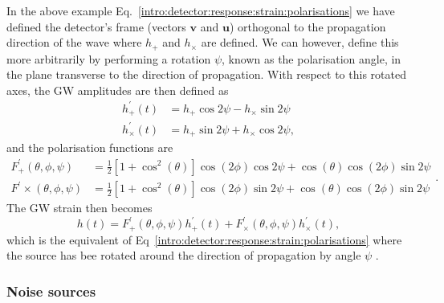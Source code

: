 In the above example Eq.~\ref{intro:detector:response:strain:polarisations} we
have defined the detector's frame (vectors $\bm{v}$ and $\bm{u}$) orthogonal to the propagation direction of the wave where $h_{+}$ and $h_{\times}$ are defined. 
We can however, define this more arbitrarily by performing a rotation $\psi$, known as the polarisation angle, in the plane transverse to the direction of propagation. 
With respect to this rotated axes, the \gls{GW} amplitudes are then defined as
\begin{equation}
	\begin{split}
		h^{\prime}_{+}(t) &= h_{+}\cos{2\psi} - h_{\times}\sin{2\psi} \\
		h^{\prime}_{\times}(t) &= h_{+}\sin{2\psi} + h_{\times}\cos{2\psi},
	\end{split}
\end{equation}
and the polarisation functions are
\begin{equation}
\label{intro:detector:polarisationfuncs}
\begin{split}
F^{\prime}_{+}(\theta,\phi,\psi) &= \frac{1}{2} \left[ 1 + \cos^2 \left(\theta\right) \right] \cos\left(2\phi\right) \cos{2\psi} + \cos \left(\theta\right) \cos \left(2\phi \right) \sin{2\psi} \\
F^{\prime}{\times}(\theta,\phi,\psi) &= \frac{1}{2} \left[ 1 + \cos^2 \left(\theta\right) \right] \cos\left(2\phi\right) \sin{2\psi} + \cos \left(\theta\right) \cos \left(2\phi \right) \sin{2\psi}
\end{split}.
\end{equation}
The \gls{GW} strain then becomes
\begin{equation}
	\label{intro:detector:strain_2}
	h(t) = F^{\prime}_{+}(\theta,\phi, \psi)h^{\prime}_{+}(t) + F^{\prime}_{\times}(\theta,\phi,\psi)h^{\prime}_{\times}(t),
\end{equation}
which is the equivalent of Eq~\ref{intro:detector:response:strain:polarisations} where the source has bee rotated around the direction of propagation by angle $\psi$ \citep{maggioreGravitationalWaves}.


\subsubsection{\label{intro:detector:noise}Noise sources}

